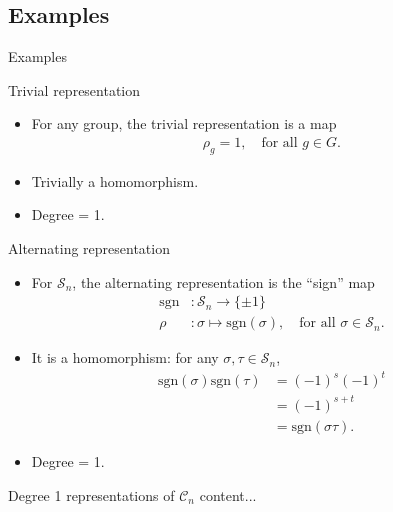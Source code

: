 \documentclass[handout, 10pt]{beamer}
\newcommand{\Sym}{\mathcal{S}}
\newcommand{\Cyc}{\mathcal{C}}
\newcommand{\sgn}{\text{sgn}}
\begin{document}
	\subsection{Examples}
	\begin{frame}[allowframebreaks]{Examples}
		\begin{block}{Trivial representation}
			\begin{itemize}
				\item For any group, the trivial representation is a map
				\begin{align*}
					\rho_g = 1, \quad \text{for all $g \in G$.}
				\end{align*}
				
				\item Trivially a homomorphism.
				
				\item Degree = 1.
			\end{itemize}
			
		\end{block}

		\begin{block}{Alternating representation}
			\begin{itemize}
				\item For $\Sym_n$, the alternating representation is the ``sign'' map
				\begin{align*}
						\sgn &: \Sym_n \rightarrow \{\pm 1\} \\
					\rho &: \sigma \mapsto \sgn(\sigma), \quad \text{for all } \sigma \in \Sym_n.
				\end{align*}
				
				\item It is a homomorphism: for any $\sigma, \tau \in \Sym_n$,
				\begin{align*}
					\sgn(\sigma)\sgn(\tau) &= (-1)^s(-1)^t \\
					&= (-1)^{s+t} \\
					&= \sgn(\sigma\tau).
				\end{align*}
				
				\item Degree = 1.
			\end{itemize}
		\end{block}
		
		\begin{block}{Degree 1 representations of $\Cyc_n$}
			content...
		\end{block}


\end{frame}
\end{document}
